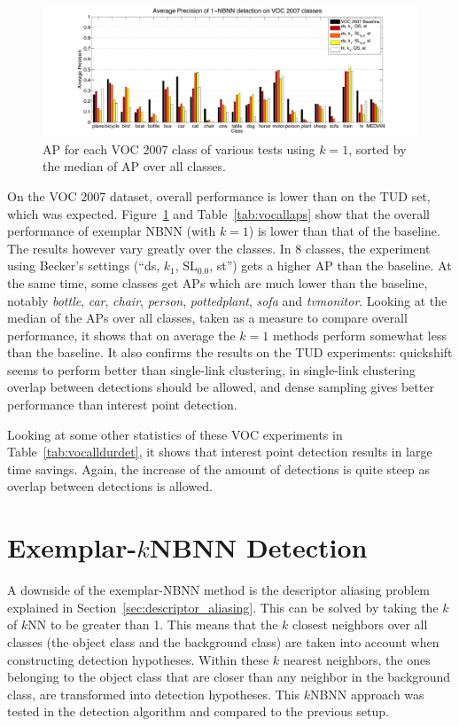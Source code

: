 \begin{figure}[hbt]
    \centering
    \includegraphics[width=\textwidth]{VOCk1ap}
    \caption{AP for each VOC 2007 class of various tests using $k=1$, sorted by the median of AP over all classes.}
    \label{fig:vock1ap}
\end{figure}

On the VOC 2007 dataset, overall performance is lower than on the TUD set, which was expected. Figure~\ref{fig:vock1ap} and Table~\ref{tab:vocallaps} show that the overall performance of exemplar NBNN (with $k=1$) is lower than that of the baseline. The results however vary greatly over the classes. In 8 classes, the experiment using Becker's settings (``ds, $k_1$, SL$_{0.0}$, st'') gets a higher AP than the baseline. At the same time, some classes get APs which are much lower than the baseline, notably \emph{bottle}, \emph{car}, \emph{chair}, \emph{person}, \emph{pottedplant}, \emph{sofa} and \emph{tvmonitor}. Looking at the median of the APs over all classes, taken as a measure to compare overall performance, it shows that on average the $k=1$ methods perform somewhat less than the baseline. It also confirms the results on the TUD experiments: quickshift seems to perform better than single-link clustering, in single-link clustering overlap between detections should be allowed, and dense sampling gives better performance than interest point detection.

Looking at some other statistics of these VOC experiments in Table~\ref{tab:vocalldurdet}, it shows that interest point detection results in large time savings. Again, the increase of the amount of detections is quite steep as overlap between detections is allowed.



\section{Exemplar-$k$NBNN Detection} %
\label{sec:local_nbnn_detection}
A downside of the exemplar-NBNN method is the descriptor aliasing problem explained in Section~\ref{sec:descriptor_aliasing}. This can be solved by taking the $k$ of $k$NN to be greater than 1. This means that the $k$ closest neighbors over all classes (the object class and the background class) are taken into account when constructing detection hypotheses. Within these $k$ nearest neighbors, the ones belonging to the object class that are closer than any neighbor in the background class, are transformed into detection hypotheses. This $k$NBNN approach was tested in the detection algorithm and compared to the previous setup. 

